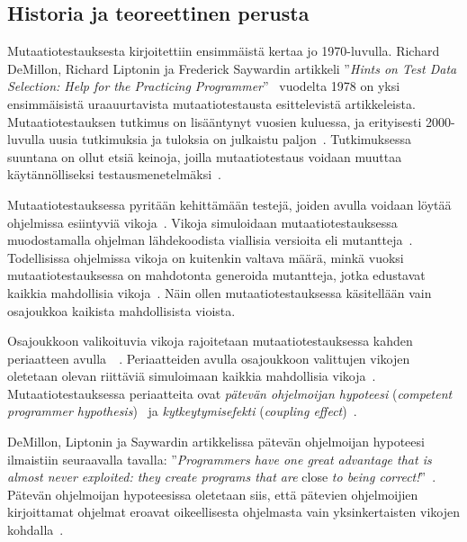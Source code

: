 \documentclass[finnish, grading]{tktltiki2}
\theoremstyle{definition}
\theoremstyle{remark}
\begin{document}
\subsection{Historia ja teoreettinen perusta}

Mutaatiotestauksesta kirjoitettiin ensimmäistä kertaa jo 1970-luvulla. Richard DeMillon, Richard Liptonin ja Frederick Saywardin artikkeli ''\textit{Hints on Test Data Selection: Help for the Practicing Programmer}''~\cite{DeMillo:Lipton:Sayward:1978} vuodelta 1978 on yksi ensimmäisistä uraauurtavista mutaatiotestausta esittelevistä artikkeleista. Mutaatiotestauksen tutkimus on lisääntynyt vuosien kuluessa, ja erityisesti 2000-luvulla uusia tutkimuksia ja tuloksia on julkaistu paljon~\cite[s. 1102]{Offutt:2011}. Tutkimuksessa suuntana on ollut etsiä keinoja, joilla mutaatiotestaus voidaan muuttaa käytännölliseksi testausmenetelmäksi~\cite[s. 649]{Jia:Harman:2011}. 

Mutaatiotestauksessa pyritään kehittämään testejä, joiden avulla voidaan löytää ohjelmissa esiintyviä vikoja~\cite[s. 650]{Jia:Harman:2011}. Vikoja simuloidaan mutaatiotestauksessa muodostamalla ohjelman lähdekoodista viallisia versioita eli mutantteja~\cite[s. 649]{Jia:Harman:2011}. Todellisissa ohjelmissa vikoja on kuitenkin valtava määrä, minkä vuoksi mutaatiotestauksessa on mahdotonta generoida mutantteja, jotka edustavat kaikkia mahdollisia vikoja~\cite[s. 650]{Jia:Harman:2011}. Näin ollen mutaatiotestauksessa käsitellään vain osajoukkoa kaikista mahdollisista vioista.

Osajoukkoon valikoituvia vikoja rajoitetaan mutaatiotestauksessa kahden periaatteen avulla~\cite[s. 5]{Offutt:1992:Coupling}~\cite[s. 650]{Jia:Harman:2011}. Periaatteiden avulla osajoukkoon valittujen vikojen oletetaan olevan riittäviä simuloimaan kaikkia mahdollisia vikoja~\cite[s. 650]{Jia:Harman:2011}. Mutaatiotestauksessa periaatteita ovat \textit{pätevän ohjelmoijan hypoteesi} (\textit{competent programmer hypothesis})~\cite[s. 34]{DeMillo:Lipton:Sayward:1978} ja \textit{kytkeytymisefekti} (\textit{coupling effect})~\cite[s. 35]{DeMillo:Lipton:Sayward:1978}.

DeMillon, Liptonin ja Saywardin artikkelissa pätevän ohjelmoijan hypoteesi ilmaistiin seuraavalla tavalla: ''\textit{Programmers have one great advantage that is almost never exploited: they create programs that are} close \textit{to being correct!}''~\cite[s. 34]{DeMillo:Lipton:Sayward:1978}. Pätevän ohjelmoijan hypoteesissa oletetaan siis, että pätevien ohjelmoijien kirjoittamat ohjelmat eroavat oikeellisesta ohjelmasta vain yksinkertaisten vikojen kohdalla~\cite[s. 5]{Offutt:1992:Coupling}.
\end{document}
